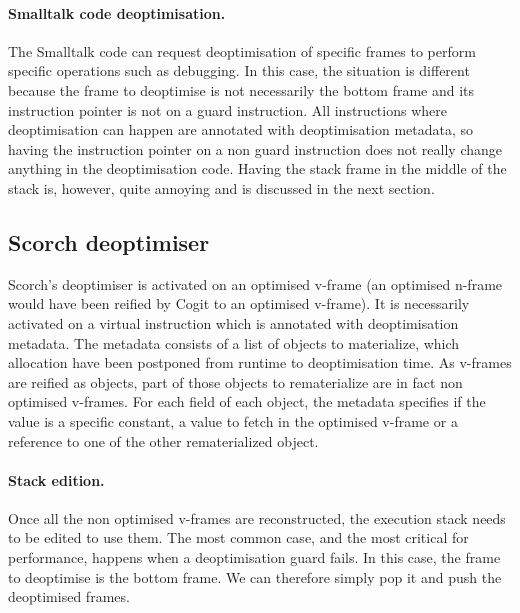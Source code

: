 \documentclass[a4paper,12pt,twoside]{../includes/ThesisStyle}
\begin{document}

\paragraph{Smalltalk code deoptimisation.}The Smalltalk code can request deoptimisation of specific frames to perform specific operations such as debugging. In this case, the situation is different because the frame to deoptimise is not necessarily the bottom frame and its instruction pointer is not on a guard instruction. All instructions where deoptimisation can happen are annotated with deoptimisation metadata, so having the instruction pointer on a non guard instruction does not really change anything in the deoptimisation code. Having the stack frame in the middle of the stack is, however, quite annoying and is discussed in the next section.


\subsection{Scorch deoptimiser}

Scorch's deoptimiser is activated on an optimised v-frame (an optimised n-frame would have been reified by Cogit to an optimised v-frame). It is necessarily activated on a virtual instruction which is annotated with deoptimisation metadata. The metadata consists of a list of objects to materialize, which allocation have been postponed from runtime to deoptimisation time. As v-frames are reified as objects, part of those objects to rematerialize are in fact non optimised v-frames. For each field of each object, the metadata specifies if the value is a specific constant, a value to fetch in the optimised v-frame or a reference to one of the other rematerialized object.

\paragraph{Stack edition.}


Once all the non optimised v-frames are reconstructed, the execution stack needs to be edited to use them. The most common case, and the most critical for performance, happens when a deoptimisation guard fails. In this case, the frame to deoptimise is the bottom frame. We can therefore simply pop it and push the deoptimised frames.
\end{document}
